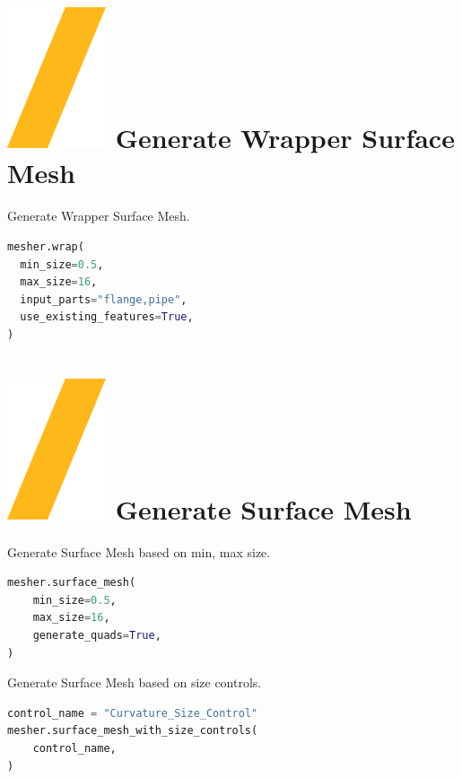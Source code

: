 \documentclass[9pt,landscape]{article}
\begin{document}
\begin{multicols}{3}
\section{\includegraphics[height=\fontcharht\font`\S]{slash.png} Generate Wrapper Surface Mesh}
Generate Wrapper Surface Mesh.
\begin{lstlisting}[language=Python]
mesher.wrap(
  min_size=0.5,
  max_size=16,
  input_parts="flange,pipe",
  use_existing_features=True,
)
\end{lstlisting}

\section{\includegraphics[height=\fontcharht\font`\S]{slash.png} Generate Surface Mesh}
Generate Surface Mesh based on min, max size. 
\begin{lstlisting}[language=Python]
mesher.surface_mesh(
    min_size=0.5,
    max_size=16,
    generate_quads=True,
)
\end{lstlisting}

Generate Surface Mesh based on size controls.  
\begin{lstlisting}[language=Python]
control_name = "Curvature_Size_Control"
mesher.surface_mesh_with_size_controls(
    control_name,
)
\end{lstlisting}


\end{multicols}
\end{document}
